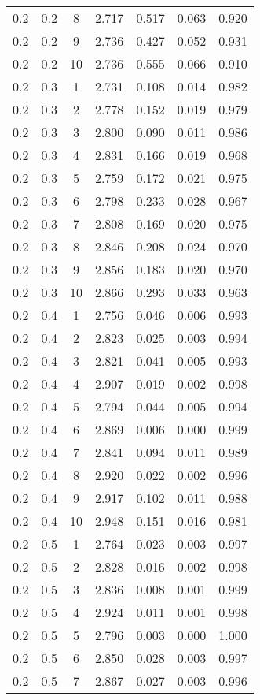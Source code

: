\begin{tabular}{|c|c|c|c|c|c|c|}
0.2 & 0.2 & 8 & 2.717 & 0.517 & 0.063 & 0.920 \\
0.2 & 0.2 & 9 & 2.736 & 0.427 & 0.052 & 0.931 \\
0.2 & 0.2 & 10 & 2.736 & 0.555 & 0.066 & 0.910 \\
0.2 & 0.3 & 1 & 2.731 & 0.108 & 0.014 & 0.982 \\
0.2 & 0.3 & 2 & 2.778 & 0.152 & 0.019 & 0.979 \\
0.2 & 0.3 & 3 & 2.800 & 0.090 & 0.011 & 0.986 \\
0.2 & 0.3 & 4 & 2.831 & 0.166 & 0.019 & 0.968 \\
0.2 & 0.3 & 5 & 2.759 & 0.172 & 0.021 & 0.975 \\
0.2 & 0.3 & 6 & 2.798 & 0.233 & 0.028 & 0.967 \\
0.2 & 0.3 & 7 & 2.808 & 0.169 & 0.020 & 0.975 \\
0.2 & 0.3 & 8 & 2.846 & 0.208 & 0.024 & 0.970 \\
0.2 & 0.3 & 9 & 2.856 & 0.183 & 0.020 & 0.970 \\
0.2 & 0.3 & 10 & 2.866 & 0.293 & 0.033 & 0.963 \\
0.2 & 0.4 & 1 & 2.756 & 0.046 & 0.006 & 0.993 \\
0.2 & 0.4 & 2 & 2.823 & 0.025 & 0.003 & 0.994 \\
0.2 & 0.4 & 3 & 2.821 & 0.041 & 0.005 & 0.993 \\
0.2 & 0.4 & 4 & 2.907 & 0.019 & 0.002 & 0.998 \\
0.2 & 0.4 & 5 & 2.794 & 0.044 & 0.005 & 0.994 \\
0.2 & 0.4 & 6 & 2.869 & 0.006 & 0.000 & 0.999 \\
0.2 & 0.4 & 7 & 2.841 & 0.094 & 0.011 & 0.989 \\
0.2 & 0.4 & 8 & 2.920 & 0.022 & 0.002 & 0.996 \\
0.2 & 0.4 & 9 & 2.917 & 0.102 & 0.011 & 0.988 \\
0.2 & 0.4 & 10 & 2.948 & 0.151 & 0.016 & 0.981 \\
0.2 & 0.5 & 1 & 2.764 & 0.023 & 0.003 & 0.997 \\
0.2 & 0.5 & 2 & 2.828 & 0.016 & 0.002 & 0.998 \\
0.2 & 0.5 & 3 & 2.836 & 0.008 & 0.001 & 0.999 \\
0.2 & 0.5 & 4 & 2.924 & 0.011 & 0.001 & 0.998 \\
0.2 & 0.5 & 5 & 2.796 & 0.003 & 0.000 & 1.000 \\
0.2 & 0.5 & 6 & 2.850 & 0.028 & 0.003 & 0.997 \\
0.2 & 0.5 & 7 & 2.867 & 0.027 & 0.003 & 0.996 \\

\end{tabular}
